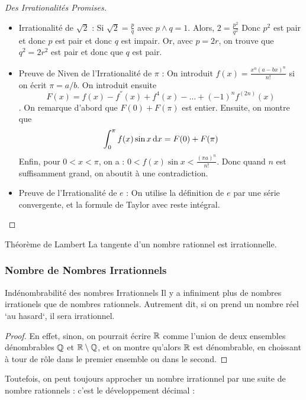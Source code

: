 \documentclass{cours}
\begin{document}
    \begin{proof}[Des Irrationalités Promises]
        \begin{itemize}
            \item Irrationalité de $\sqrt{2}$ : Si $\sqrt{2} = \frac{p}{q}$ avec $p \wedge q = 1$. Alors, $2 = \frac{p^{2}}{q^{2}}$ Donc $p^{2}$ est pair et donc $p$ est pair et donc $q$ est impair. Or, avec $p = 2r$, on trouve que $q^{2} = 2r^{2}$ est pair et donc que $q$ est pair.
            \item Preuve de Niven de l'Irrationalité de $\pi$ : On introduit $f(x) = \frac{x^{n}(a-bx)^{n}}{n!}$ si on écrit $\pi = a/b$. On introduit ensuite \[F(x) = f(x) - f^{''}(x) + f^{4}(x) - \ldots + \left(-1\right)^{n}f^{(2n)}(x)\]. On remarque d'abord que $F(0) + F(\pi)$ est entier. Ensuite, on montre que \[\int_{0}^{\pi}f(x) \sin x {\rm \, d} x = F(0) + F(\pi)\] Enfin, pour $0 < x < \pi$, on a : $0 < f(x)\sin x < \frac{\left(\pi a\right)^{n}}{n!}$. Donc quand $n$ est suffisamment grand, on aboutit à une contradiction. 
            \item Preuve de l'Irrationalité de $e$ : On utilise la définition de $e$ par une série convergente, et la formule de Taylor avec reste intégral. 
        \end{itemize}
    \end{proof}

    \begin{corollaire}{Théorème de Lambert}{}
        La tangente d'un nombre rationnel est irrationnelle.
    \end{corollaire}

    \subsubsection{Nombre de Nombres Irrationnels}
    \begin{théorème}{Indénombrabilité des nombres Irrationnels}{}
        Il y a infiniment plus de nombres irrationels que de nombres rationnels. Autrement dit, si on prend un nombre réel `au hasard`, il sera irrationnel.
    \end{théorème}
    \begin{proof}
        En effet, sinon, on pourrait écrire $\mathbb{R}$ comme l'union de deux ensembles dénombrables $\mathbb{Q}$ et $\mathbb{R}\setminus\mathbb{Q}$, et on montre qu'alors $\mathbb{R}$ est dénombrable, en choissant à tour de rôle dans le premier ensemble ou dans le second.
    \end{proof}

    Toutefois, on peut toujours approcher un nombre irrationnel par une suite de nombre rationnels : c'est le développement décimal :
    
\end{document}
